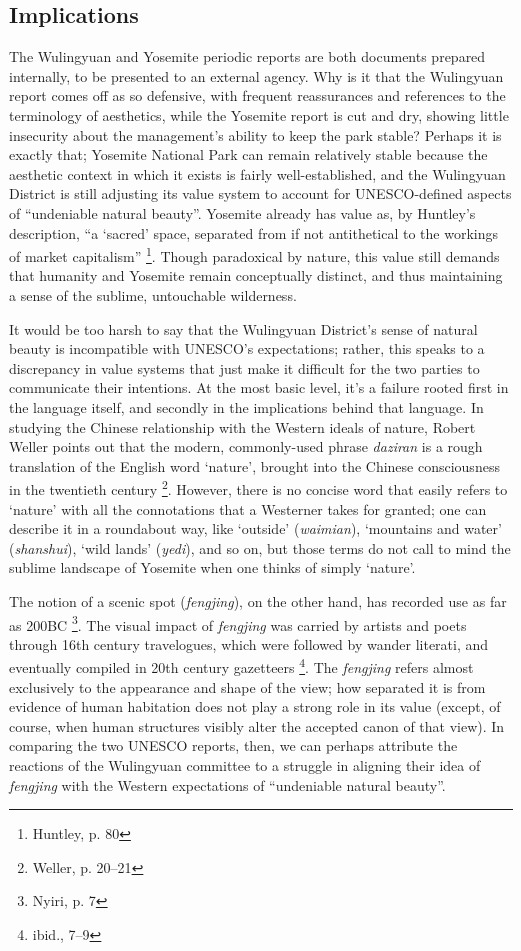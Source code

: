 \subsection*{Implications}

The Wulingyuan and Yosemite periodic reports are both documents prepared
internally, to be presented to an external agency. Why is it that the
Wulingyuan report comes off as so defensive, with frequent reassurances and
references to the terminology of aesthetics, while the Yosemite report is cut
and dry, showing little insecurity about the management's ability to keep the
park stable? Perhaps it is exactly that; Yosemite National Park can remain
relatively stable because the aesthetic context in which it exists is fairly
well-established, and the Wulingyuan District is still adjusting its value
system to account for UNESCO-defined aspects of ``undeniable natural beauty''.
Yosemite already has value as, by Huntley's description, ``a `sacred' space, separated from if not
antithetical to the workings of market capitalism'' \footnote{Huntley, p. 80}.
Though paradoxical by nature, this value still demands that humanity and
Yosemite remain conceptually distinct, and thus maintaining a sense of the
sublime, untouchable wilderness.

It would be too harsh to say that the Wulingyuan District's sense of natural
beauty is incompatible with UNESCO's expectations; rather, this speaks to a
discrepancy in value systems that just make it difficult for the two parties to
communicate their intentions. At the most basic level, it's a failure rooted
first in the language itself, and secondly in the implications behind that
language. In studying the Chinese relationship with the Western ideals of
nature, Robert Weller points out that the modern, commonly-used phrase
\textit{daziran} is a rough translation of the English word `nature', brought
into the Chinese consciousness in the twentieth century \footnote{Weller, p.
20--21}. However, there is no concise word that easily refers to `nature' with
all the connotations that a Westerner takes for granted; one can describe it in
a roundabout way, like `outside' (\textit{waimian}), `mountains and water'
(\textit{shanshui}), `wild lands' (\textit{yedi}), and so on, but those terms
do not call to mind the sublime landscape of Yosemite when one thinks of simply `nature'.

The notion of a scenic spot (\textit{fengjing}), on the other hand, has
recorded use as far as 200BC \footnote{Nyiri, p. 7}. The visual impact of
\textit{fengjing} was carried by artists and poets through 16th century
travelogues, which were followed by wander literati, and eventually compiled in
20th century gazetteers \footnote{ibid., 7--9}. The \textit{fengjing} refers
almost exclusively to the appearance and shape of the view; how separated it is
from evidence of human habitation does not play a strong role in its value
(except, of course, when human structures visibly alter the accepted canon of
that view). In comparing the two UNESCO reports, then, we can perhaps attribute
the reactions of the Wulingyuan committee to a struggle in aligning their idea
of \textit{fengjing} with the Western expectations of ``undeniable natural
beauty''.

